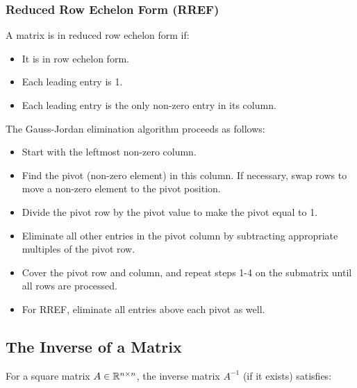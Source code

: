 \subsubsection{Reduced Row Echelon Form (RREF)}

A matrix is in reduced row echelon form if:

\begin{itemize}

    \item It is in row echelon form.

    \item Each leading entry is 1.

    \item Each leading entry is the only non-zero entry in its column.

\end{itemize}

The Gauss-Jordan elimination algorithm proceeds as follows:

\begin{itemize}

    \item Start with the leftmost non-zero column.

    \item Find the pivot (non-zero element) in this column. If necessary, swap rows to move a non-zero element to the pivot position.

    \item Divide the pivot row by the pivot value to make the pivot equal to 1.

    \item Eliminate all other entries in the pivot column by subtracting appropriate multiples of the pivot row.

    \item Cover the pivot row and column, and repeat steps 1-4 on the submatrix until all rows are processed.

    \item For RREF, eliminate all entries above each pivot as well.

\end{itemize}

\subsection{The Inverse of a Matrix}

For a square matrix \(A \in \mathbb{R}^{n \times n}\), the inverse matrix \(A^{-1}\) (if it exists) satisfies:


